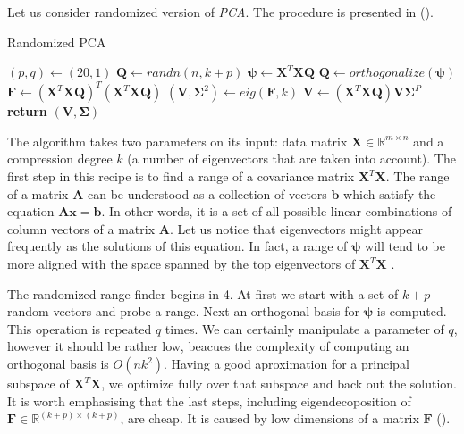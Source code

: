 Let us consider randomized version of \textit{PCA}. The procedure is presented in  (\cite{Mineiro}). 
\begin{algorithm}
    \caption{Randomized PCA}\label{alg:rpca1}
    \begin{algorithmic}[1]
        \State $(p,q) \gets (20,1)$
        \State $\boldsymbol{Q} \gets randn(n, k+p)$
                \State $\boldsymbol{\psi} \gets \boldsymbol{X}^T\boldsymbol{X}\boldsymbol{Q}$
                \State $\boldsymbol{Q} \gets orthogonalize(\boldsymbol{\psi})$
            \EndFor
            \State $\boldsymbol{F} \gets (\boldsymbol{X}^T\boldsymbol{X}\boldsymbol{Q})^T(\boldsymbol{X}^T\boldsymbol{X}\boldsymbol{Q})$
            \State $(\boldsymbol{V},\boldsymbol{\Sigma}^2) \gets eig(\boldsymbol{F},k)$
            \State $\boldsymbol{V} \gets (\boldsymbol{X}^T\boldsymbol{X}\boldsymbol{Q})\boldsymbol{V}\boldsymbol{\Sigma}^P$
            \State \textbf{return} $(\boldsymbol{V}, \boldsymbol{\Sigma})$
        \EndFunction
    \end{algorithmic}
\end{algorithm}
The algorithm takes two parameters on its input: data matrix $\boldsymbol{X} \in \mathbb{R}^{m \times n}$ and a compression degree $k$ (a number of eigenvectors that are taken into account). The first step in this recipe is to find a range of a covariance matrix $\boldsymbol{X}^T\boldsymbol{X}$. The range of a matrix $\boldsymbol{A}$ can be understood as a collection of vectors $\boldsymbol{b}$ which satisfy the equation $\boldsymbol{A}\boldsymbol{x}=\boldsymbol{b}$. In other words, it is a set of all possible linear combinations of column vectors of a matrix $\boldsymbol{A}$. Let us notice that eigenvectors might appear frequently as the solutions of this equation. In fact, a range of $\boldsymbol{\psi}$ will tend to be more aligned with the space spanned by the top eigenvectors of $\boldsymbol{X}^T\boldsymbol{X}$ \cite{Mineiro}. 

The randomized range finder begins in 4. At first we start with a set of $k+p$ random vectors and probe a range. Next an orthogonal basis for $\boldsymbol{\psi}$ is computed. This operation is repeated $q$ times. We can certainly manipulate a parameter of $q$, however it should be rather low, beacues the complexity of computing an orthogonal basis is $O(nk^2)$. 
Having a good aproximation for a principal subspace of $\boldsymbol{X}^T\boldsymbol{X}$, we optimize fully over that subspace and back out the solution. It is worth emphasising that the last steps, including eigendecoposition of $\boldsymbol{F} \in \mathbb{R}^{(k+p) \times (k+p)}$, are cheap. It is caused by low dimensions of a matrix $\boldsymbol{F}$ (\cite{Mineiro}).

